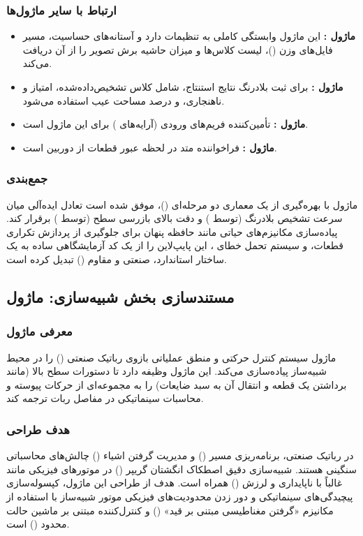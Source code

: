 \documentclass{article}
\begin{document}
\subsubsection{ارتباط با سایر ماژول‌ها}
\begin{itemize}
	\item \textbf{ماژول :} این ماژول وابستگی کاملی به تنظیمات دارد و آستانه‌های حساسیت، مسیر فایل‌های وزن ()، لیست کلاس‌ها و میزان حاشیه برش تصویر را از آن دریافت می‌کند.
	\item \textbf{ماژول :} برای ثبت بلادرنگ نتایج استنتاج، شامل کلاس تشخیص‌داده‌شده، امتیاز  و ناهنجاری، و درصد مساحت عیب استفاده می‌شود.
	\item \textbf{ماژول :} تأمین‌کننده فریم‌های ورودی (آرایه‌های ) برای این ماژول است.
	\item \textbf{ماژول :} فراخواننده متد  در لحظه عبور قطعات از دوربین است.
\end{itemize}

\subsubsection{جمع‌بندی}
ماژول  با بهره‌گیری از یک معماری دو مرحله‌ای ()، موفق شده است تعادل ایده‌آلی میان سرعت تشخیص بلادرنگ (توسط ) و دقت بالای بازرسی سطح (توسط ) برقرار کند. پیاده‌سازی مکانیزم‌های حیاتی مانند حافظه پنهان برای جلوگیری از پردازش تکراری قطعات، و سیستم تحمل خطای ، این پایپ‌لاین را از یک کد آزمایشگاهی ساده به یک ساختار استاندارد، صنعتی و مقاوم () تبدیل کرده است.


\subsection{مستندسازی بخش شبیه‌سازی: ماژول }

\subsubsection{معرفی ماژول}
ماژول  سیستم کنترل حرکتی و منطق عملیاتی بازوی رباتیک صنعتی () را در محیط شبیه‌ساز پیاده‌سازی می‌کند. این ماژول وظیفه دارد تا دستورات سطح بالا (مانند برداشتن یک قطعه و انتقال آن به سبد ضایعات) را به مجموعه‌ای از حرکات پیوسته و محاسبات سینماتیکی در مفاصل ربات ترجمه کند.

\subsubsection{هدف طراحی}
در رباتیک صنعتی، برنامه‌ریزی مسیر () و مدیریت گرفتن اشیاء () چالش‌های محاسباتی سنگینی هستند. شبیه‌سازی دقیق اصطکاک انگشتان گریپر () در موتورهای فیزیکی مانند  غالباً با ناپایداری و لرزش () همراه است. هدف از طراحی این ماژول، کپسوله‌سازی پیچیدگی‌های سینماتیکی و دور زدن محدودیت‌های فیزیکی موتور شبیه‌ساز با استفاده از مکانیزم «گرفتن مغناطیسی مبتنی بر قید» () و کنترل‌کننده مبتنی بر ماشین حالت محدود () است.
\end{document}
